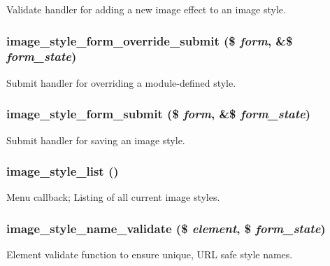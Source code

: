 \label{image_8admin_8inc_a9576207548aa3eb3c27ffc1caf679be5}
Validate handler for adding a new image effect to an image style. \hypertarget{image_8admin_8inc_a63f14b7dbc720d2bde357c09ee419614}{
\subsubsection[{image\_\-style\_\-form\_\-override\_\-submit}]{\setlength{\rightskip}{0pt plus 5cm}image\_\-style\_\-form\_\-override\_\-submit (\$ {\em form}, \/  \&\$ {\em form\_\-state})}}
\label{image_8admin_8inc_a63f14b7dbc720d2bde357c09ee419614}
Submit handler for overriding a module-\/defined style. \hypertarget{image_8admin_8inc_a20848bbee768081e10fc4ff75c497e02}{
\subsubsection[{image\_\-style\_\-form\_\-submit}]{\setlength{\rightskip}{0pt plus 5cm}image\_\-style\_\-form\_\-submit (\$ {\em form}, \/  \&\$ {\em form\_\-state})}}
\label{image_8admin_8inc_a20848bbee768081e10fc4ff75c497e02}
Submit handler for saving an image style. \hypertarget{image_8admin_8inc_a1040bda054f5adc80cc8854e3ff26406}{
\subsubsection[{image\_\-style\_\-list}]{\setlength{\rightskip}{0pt plus 5cm}image\_\-style\_\-list ()}}
\label{image_8admin_8inc_a1040bda054f5adc80cc8854e3ff26406}
Menu callback; Listing of all current image styles. \hypertarget{image_8admin_8inc_a4f3ad0b45847dc4707cc568e0836107d}{
\subsubsection[{image\_\-style\_\-name\_\-validate}]{\setlength{\rightskip}{0pt plus 5cm}image\_\-style\_\-name\_\-validate (\$ {\em element}, \/  \$ {\em form\_\-state})}}
\label{image_8admin_8inc_a4f3ad0b45847dc4707cc568e0836107d}
Element validate function to ensure unique, URL safe style names.

